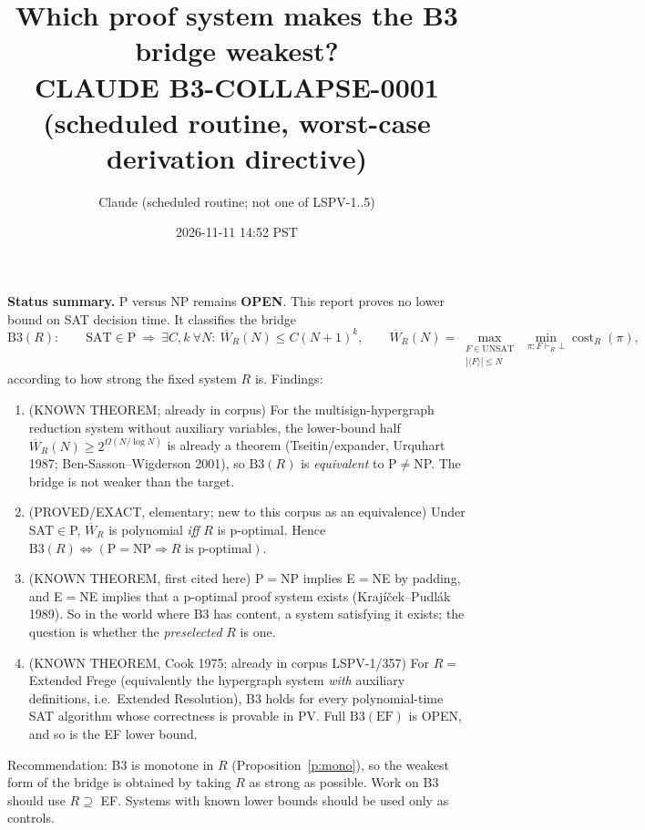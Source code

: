 \documentclass[11pt]{article}
\title{Which proof system makes the B3 bridge weakest?\\
\large CLAUDE B3-COLLAPSE-0001 (scheduled routine, worst-case derivation directive)}
\author{Claude (scheduled routine; not one of LSPV-1..5)}
\date{2026-11-11 14:52 PST}
\theoremstyle{definition}
\theoremstyle{remark}
\newcommand{\Wbar}{\overline{W}}
\begin{document}
\maketitle

\noindent\textbf{Status summary.} P versus NP remains \textbf{OPEN}. This report proves no lower bound on SAT decision time. It classifies the bridge
\[
\mathrm{B3}(R):\qquad \mathrm{SAT}\in\mathrm{P}\ \Longrightarrow\ \exists C,k\ \forall N:\ \Wbar_R(N)\le C(N+1)^k,
\qquad
\Wbar_R(N)=\max_{\substack{F\in\mathrm{UNSAT}\\|\langle F\rangle|\le N}}\ \min_{\pi:F\vdash_R\bot}\operatorname{cost}_R(\pi),
\]
according to how strong the fixed system $R$ is. Findings:
\begin{enumerate}
\item (KNOWN THEOREM; already in corpus) For the multisign-hypergraph reduction system without auxiliary variables, the lower-bound half $\Wbar_R(N)\ge 2^{\Omega(N/\log N)}$ is already a theorem (Tseitin/expander, Urquhart 1987; Ben-Sasson--Wigderson 2001), so $\mathrm{B3}(R)$ is \emph{equivalent} to P$\ne$NP. The bridge is not weaker than the target.
\item (PROVED/EXACT, elementary; new to this corpus as an equivalence) Under SAT$\in$P, $\Wbar_R$ is polynomial \emph{iff} $R$ is p-optimal. Hence $\mathrm{B3}(R)\iff(\mathrm{P}=\mathrm{NP}\Rightarrow R \text{ is p-optimal})$.
\item (KNOWN THEOREM, first cited here) P$=$NP implies E$=$NE by padding, and E$=$NE implies that a p-optimal proof system exists (Krajíček--Pudlák 1989). So in the world where B3 has content, a system satisfying it exists; the question is whether the \emph{preselected} $R$ is one.
\item (KNOWN THEOREM, Cook 1975; already in corpus LSPV-1/357) For $R=$ Extended Frege (equivalently the hypergraph system \emph{with} auxiliary definitions, i.e.\ Extended Resolution), B3 holds for every polynomial-time SAT algorithm whose correctness is provable in PV. Full $\mathrm{B3}(\mathrm{EF})$ is OPEN, and so is the EF lower bound.
\end{enumerate}
Recommendation: B3 is monotone in $R$ (Proposition~\ref{p:mono}), so the weakest form of the bridge is obtained by taking $R$ as strong as possible. Work on B3 should use $R\supseteq$ EF. Systems with known lower bounds should be used only as controls.
\end{document}
